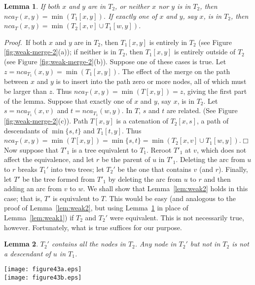 \documentclass[twoside,leqno,twocolumn]{article}
\newtheorem{lemma}{Lemma}
\newcommand{\proof}{\noindent \emph{Proof.}\ }
\newcommand{\proofend}{$\Box$\\}
\newcommand{\nca}{\mathit{nca}}
\begin{document}
\begin{lemma}\label{lem:weak3} If both $x$ and $y$ are in $T_2$, or neither $x$ nor $y$ is in $T_2$, then $\nca_T(x, y) = \min(T_1[x,y])$.  If exactly one of $x$ and $y$, say $x$, is in $T_2$, then
$\nca_{T}(x, y) = \min(T_2[x, v] \cup T_1[w, y])$.
\end{lemma}
\proof If both $x$ and $y$ are in $T_2$, then $T_1[x,y]$ is entirely in $T_2$ (see Figure \ref{fig:weak-merge-2}(a)); if neither is in $T_2$, then $T_1[x,y]$ is entirely outside of $T_2$ (see Figure \ref{fig:weak-merge-2}(b)).  Suppose one of these cases is true.  Let $z = \nca_{T_1}(x, y) = \min(T_1[x, y])$.  The effect of the merge on the path between $x$ and $y$ is to insert into the path zero or more nodes, all of which must be larger than $z$.  Thus $\nca_{T}(x, y) = \min(T[x, y]) = z$, giving the first part of the lemma.  Suppose that exactly one of $x$ and $y$, say $x$, is in $T_2$.  Let $s = \nca_{T_1}(x, v)$ and $t = \nca_{T_1}(w, y)$. In $T$, $s$ and $t$ are related. (See Figure \ref{fig:weak-merge-2}(c)). Path $T[x,y]$ is a catenation of $T_2[x,s]$, a path of descendants of $\min\{s, t\}$ and $T_1[t,y]$. Thus $\nca_{T}(x, y) = \min(T[x, y]) = \min\{s, t\} = \min(T_2[x,v] \cup T_1[w,y])$.\proofend


Now suppose that $T'_1$ is a tree equivalent to $T_1$.  Reroot $T'_1$ at $v$, which does not affect the equivalence, and let $r$ be the parent of $u$ in $T'_1$. Deleting the arc from $u$ to $r$ breaks $T_1'$ into two trees; let $T_2'$ be the one that contains $v$ (and $r$).  Finally, let $T'$ be the tree formed from $T'_1$ by deleting the arc from $u$ to $r$ and then adding an arc from $v$ to $w$. We shall show that Lemma~\ref{lem:weak2} holds in this case; that is, $T'$ is equivalent to $T$.  This would be easy (and analogous to the proof of Lemma~\ref{lem:weak2}, but using Lemma~\ref{lem:weak3} in place of Lemma~\ref{lem:weak1}) if $T_2$ and $T_2'$ were equivalent.  This is not necessarily true, however.  Fortunately, what is true suffices for our purpose.

\begin{lemma}
\label{lem:weak4} $T_2'$ contains all the nodes in $T_2$.  Any node in $T_2'$ but not in $T_2$ is not a descendant of $u$ in $T_1$.
\end{lemma}

\begin{figure*}\begin{center}
\resizebox{.65\textwidth}{!} {\texttt{[image: figure43a.eps]}}\\
\vspace{1cm}
\resizebox{.65\textwidth}{!} {\texttt{[image: figure43b.eps]}}
\end{center}
\caption{\label{fig:weak-merge-3} Proof of Lemma~\ref{lem:weak4}.
Node $u = \nca_{T_1}(v,w)$, $q$ is the child of $u$ in $T_1$ that is an ancestor of $v$, and $r$ is the parent of $u$ in $T_1'$.
(a) Assuming $x$ is not in $T'_2$ implies $\mathit{nca}_{T_1}(x,v) \le u$, a contradiction. (b) If $x$ is in $T'_2$ but not in $T_2$ then
$\nca_{T_1}(x,v) < u$.}
\end{figure*}
\end{document}
